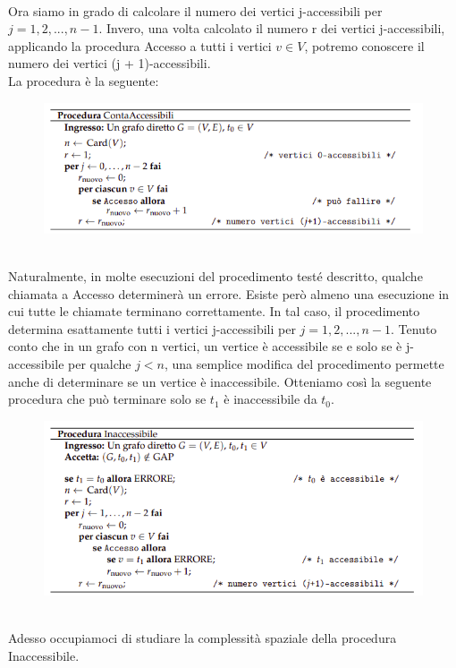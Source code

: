 \\Ora siamo in grado di calcolare il numero dei vertici j-accessibili per $j =1,2, ...,n - 1$. Invero, una volta calcolato il numero r dei vertici j-accessibili, applicando la procedura Accesso a tutti i vertici $v \in V$, potremo conoscere il numero dei vertici (j + 1)-accessibili.
\\La procedura è la seguente:
\begin{figure}[htp]
    \centering
    \includegraphics[scale=0.6]{tesi_stile/img/nl2.png}
\end{figure}
\\Naturalmente, in molte esecuzioni del procedimento testé descritto, qualche chiamata a Accesso determinerà un errore. Esiste però almeno una esecuzione in cui tutte
le chiamate terminano correttamente. In tal caso, il procedimento determina esattamente tutti i vertici j-accessibili per $j = 1, 2, ... , n - 1$. Tenuto conto che in un grafo con n vertici, un vertice è accessibile se e solo se è j-accessibile per qualche $j < n$, una semplice modifica del procedimento permette anche di determinare se un vertice è inaccessibile. Otteniamo così la seguente procedura che può terminare solo se $t_1$ è inaccessibile da $t_0$.
\begin{figure}[htp]
    \centering
    \includegraphics[scale=0.6]{tesi_stile/img/nl3.png}
\end{figure}
\\Adesso occupiamoci di studiare la complessità spaziale della procedura Inaccessibile.
